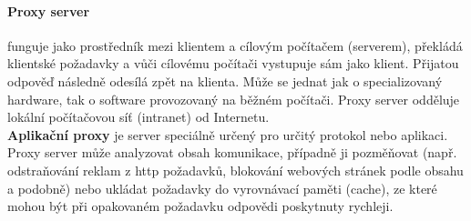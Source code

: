 \documentclass[10pt,a4paper]{article}
\begin{document}
\paragraph {Proxy server} funguje jako prostředník mezi klientem a cílovým počítačem (serverem), překládá klientské požadavky a vůči cílovému počítači vystupuje sám jako klient. Přijatou odpověď následně odesílá zpět na klienta. Může se jednat jak o specializovaný hardware, tak o software provozovaný na běžném počítači. Proxy server odděluje lokální počítačovou síť (intranet) od Internetu. \\
\textbf{Aplikační proxy} je server speciálně určený pro určitý protokol nebo aplikaci. Proxy server může analyzovat obsah komunikace, případně ji pozměňovat (např. odstraňování reklam z http požadavků, blokování webových stránek podle obsahu a podobně) nebo ukládat požadavky do vyrovnávací paměti (cache), ze které mohou být při opakovaném požadavku odpovědi poskytnuty rychleji.
\end{document}
